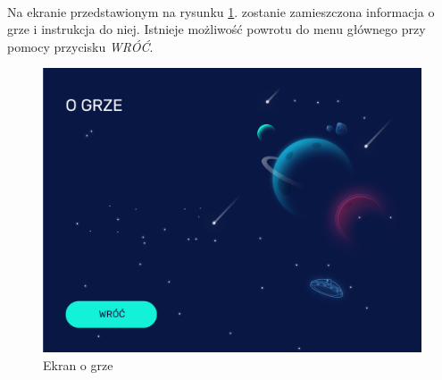 \documentclass[a4paper]{article}
\begin{document}
\paragraph{}Na ekranie przedstawionym na rysunku \ref{fig:o grze}. zostanie zamieszczona informacja o grze i instrukcja do niej. Istnieje możliwość powrotu do menu głównego przy pomocy przycisku \textit{WRÓĆ}.
\begin{figure}[H]
    \centering
    \includegraphics[width=1\textwidth]{img/ekran-o-grze.png}
    \caption{Ekran o grze}
    \label{fig:o grze}
\end{figure}

\newpage
\end{document}
